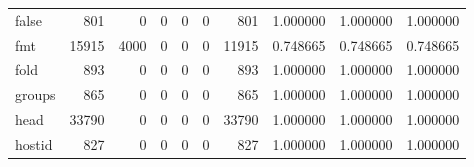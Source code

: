 \begin{tabular}{lrrrrrrrrr}
false     &                                 801 &                                               0 &                                              0 &                                             0 &                                              0 &                                          801 &                                           1.000000 &                               1.000000 &                             1.000000 \\
fmt       &                               15915 &                                            4000 &                                              0 &                                             0 &                                              0 &                                        11915 &                                           0.748665 &                               0.748665 &                             0.748665 \\
fold      &                                 893 &                                               0 &                                              0 &                                             0 &                                              0 &                                          893 &                                           1.000000 &                               1.000000 &                             1.000000 \\
groups    &                                 865 &                                               0 &                                              0 &                                             0 &                                              0 &                                          865 &                                           1.000000 &                               1.000000 &                             1.000000 \\
head      &                               33790 &                                               0 &                                              0 &                                             0 &                                              0 &                                        33790 &                                           1.000000 &                               1.000000 &                             1.000000 \\
hostid    &                                 827 &                                               0 &                                              0 &                                             0 &                                              0 &                                          827 &                                           1.000000 &                               1.000000 &                             1.000000 \\

\end{tabular}
